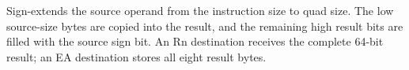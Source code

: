 Sign-extends the source operand from the instruction size to quad size. The low source-size bytes are copied into the result, and the remaining high result bits are filled with the source sign bit. An Rn destination receives the complete 64-bit result; an EA destination stores all eight result bytes.
